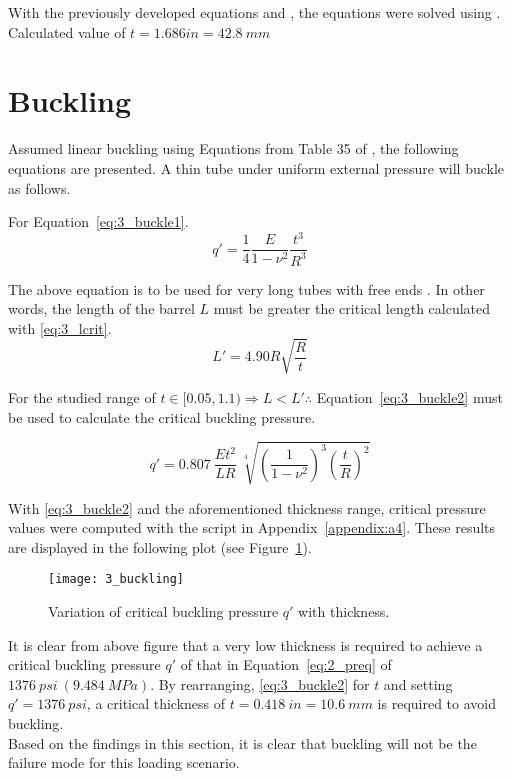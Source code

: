 With the previously developed equations and \cite{roarks}, the equations were solved using \cite{EXCEL}.\\

Calculated value of $t=1.686 in  = 42.8\ mm$

\section{Buckling}
\label{section:3_buckle}

Assumed linear buckling using Equations from Table 35 of \cite{roarks}, the following equations are presented. A thin tube under uniform external pressure will buckle as follows.

For Equation~\ref{eq:3_buckle1}.
\begin{equation}
	\label{eq:3_buckle1}
	q' =\frac{1}{4} \frac{E}{1-\nu^2} \frac{t^3}{R^3}
\end{equation}

The above equation is to be used for very long tubes with free ends \cite{roarks}. In other words, the length of the barrel $L$ must be greater the critical length calculated with \ref{eq:3_lcrit}.
\begin{equation}
	\label{eq:3_lcrit}
	L' = 4.90 R \sqrt{\frac{R}{t}}
\end{equation}

For the studied range of $t \in [0.05, 1.1) \Rightarrow L < L' \therefore$ Equation~\ref{eq:3_buckle2} must be used to calculate the critical buckling pressure.

\begin{equation}
	\label{eq:3_buckle2}
	q' =0.807\  \frac{Et^2}{LR}\  \sqrt[4]{\left( \frac{1}{1-\nu^2} \right)^3 \left( \frac{t}{R}\right)^2}
\end{equation}

With \ref{eq:3_buckle2} and the aforementioned thickness range, critical pressure values were computed with the \cite{PYTHON} script in Appendix~\ref{appendix:a4}. These results are displayed in the following plot (see Figure~\ref{fig:3_buckling}).

\begin{figure}[H]
	\centering
	\texttt{[image: 3\_buckling]}
	\caption{Variation of critical buckling pressure $q'$ with thickness.}
	\label{fig:3_buckling}
\end{figure}

It is clear from above figure that a very low thickness is required to achieve a critical buckling pressure $q'$ of that in Equation~\ref{eq:2_preq} of $1376\ psi\ (9.484\ MPa)$. By rearranging, \ref{eq:3_buckle2} for $t$ and setting $q'=1376\ psi$, a critical thickness of $t=0.418\ in= 10.6\ mm$ is required to avoid buckling.\\

Based on the findings in this section, it is clear that buckling will not be the failure mode for this loading scenario.



